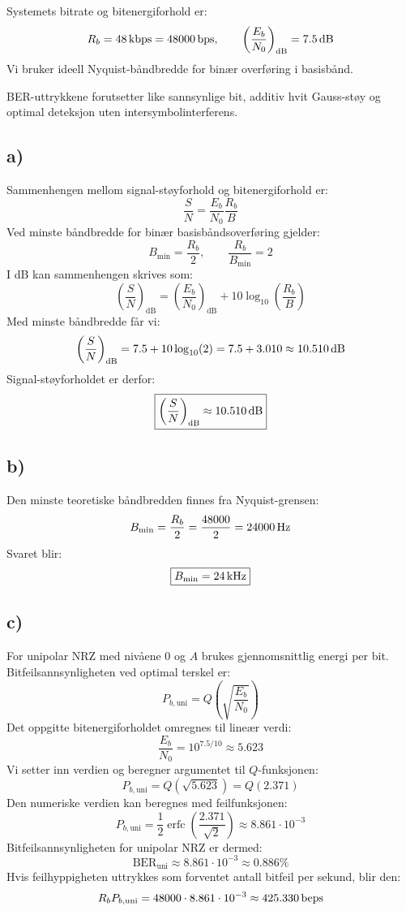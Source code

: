 Systemets bitrate og bitenergiforhold er:
\[
    R_b=48\,\mathrm{kbps}=48000\,\mathrm{bps},\qquad
    \left(\frac{E_b}{N_0}\right)_{\mathrm{dB}}=7.5\,\mathrm{dB}
\]
Vi bruker ideell Nyquist-båndbredde for binær overføring i basisbånd.

BER-uttrykkene forutsetter like sannsynlige bit, additiv hvit Gauss-støy og optimal deteksjon uten intersymbolinterferens.

\subsection*{a)}
Sammenhengen mellom signal-støyforhold og bitenergiforhold er:
\[
    \frac{S}{N}=\frac{E_b}{N_0}\frac{R_b}{B}
\]
Ved minste båndbredde for binær basisbåndsoverføring gjelder:
\[
    B_{\min}=\frac{R_b}{2},\qquad\frac{R_b}{B_{\min}}=2
\]
I dB kan sammenhengen skrives som:
\[
    \left(\frac{S}{N}\right)_{\mathrm{dB}}
       =\left(\frac{E_b}{N_0}\right)_{\mathrm{dB}}
        +10\log_{10}\!\left(\frac{R_b}{B}\right)
\]
Med minste båndbredde får vi:
\[
    \left(\frac{S}{N}\right)_{\mathrm{dB}}
       =7.5+10\log_{10}(2)
       =7.5+3.010\approx10.510\,\mathrm{dB}
\]
Signal-støyforholdet er derfor:
\[
    \boxed{\left(\frac{S}{N}\right)_{\mathrm{dB}}\approx10.510\,\mathrm{dB}}
\]

\subsection*{b)}
Den minste teoretiske båndbredden finnes fra Nyquist-grensen:
\[
    B_{\min}=\frac{R_b}{2}=\frac{48000}{2}=24000\,\mathrm{Hz}
\]
Svaret blir:
\[
    \boxed{B_{\min}=24\,\mathrm{kHz}}
\]

\newpage
\subsection*{c)}
For unipolar NRZ med nivåene $0$ og $A$ brukes gjennomsnittlig energi per bit. Bitfeilsannsynligheten ved optimal terskel er:
\[
    P_{b,\mathrm{uni}}=Q\!\left(\sqrt{\frac{E_b}{N_0}}\right)
\]
Det oppgitte bitenergiforholdet omregnes til lineær verdi:
\[
    \frac{E_b}{N_0}=10^{7.5/10}\approx5.623
\]
Vi setter inn verdien og beregner argumentet til $Q$-funksjonen:
\[
    P_{b,\mathrm{uni}}=Q(\sqrt{5.623})=Q(2.371)
\]
Den numeriske verdien kan beregnes med feilfunksjonen:
\[
    P_{b,\mathrm{uni}}=\frac{1}{2}\operatorname{erfc}\!\left(
        \frac{2.371}{\sqrt{2}}\right)
        \approx8.861\cdot10^{-3}
\]
Bitfeilsannsynligheten for unipolar NRZ er dermed:
\[
    \boxed{\mathrm{BER}_{\mathrm{uni}}\approx8.861\cdot10^{-3}
    \approx0.886\%}
\]
Hvis feilhyppigheten uttrykkes som forventet antall bitfeil per sekund, blir den:
\[
    R_bP_{b,\mathrm{uni}}
       =48000\cdot8.861\cdot10^{-3}
       \approx425.330\,\mathrm{beps}
\]

